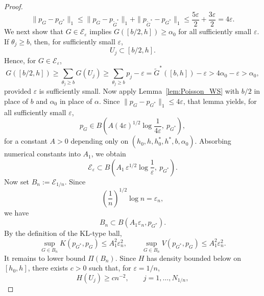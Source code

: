 \documentclass[twoside,12pt]{article}
\begin{document}
\begin{proof}
\begin{displaymath}
\|p_G-p_{G^\ast}\|_1\le\|p_G-p_{\tilde G^\ast}\|_1+\|p_{\tilde G^\ast}-p_{G^\ast}\|_1\le\frac{5\varepsilon}{2}+\frac{3\varepsilon}{2}=4\varepsilon.
\end{displaymath}
We next show that $G\in\mathcal E_\varepsilon$ implies $G([b/2,h])\ge\alpha_0$ for all sufficiently small $\varepsilon$. If $\theta_j\ge b$, then, for sufficiently small $\varepsilon$,
\begin{displaymath}
U_j\subset [b/2,h].
\end{displaymath}
Hence, for $G\in\mathcal E_\varepsilon$,
\begin{displaymath}
G([b/2,h])\ge\sum_{\theta_j\ge b}G(U_j)\ge\sum_{\theta_j\ge b}p_j-\varepsilon=\tilde G^\ast([b,h])-\varepsilon>4\alpha_0-\varepsilon>\alpha_0,
\end{displaymath}
provided $\varepsilon$ is sufficiently small. Now apply Lemma~\ref{lem:Poisson_WS} with $b/2$ in place of $b$ and $\alpha_0$ in place of $\alpha$. Since $\|p_G-p_{G^\ast}\|_1\le 4\varepsilon$, that lemma yields, for all sufficiently
small $\varepsilon$,
\begin{displaymath}
p_G\in B\!\left(A(4\varepsilon)^{1/2}\log\frac{1}{4\varepsilon},\ p_{G^\ast}\right),
\end{displaymath}
for a constant $A>0$ depending only on $(h_0,h,h_0^\ast,h^\ast,b,\alpha_0)$. Absorbing numerical constants into $A_1$, we obtain
\begin{displaymath}
\mathcal E_\varepsilon\subset B\!\left(A_1\,\varepsilon^{1/2}\log\frac{1}{\varepsilon},\ p_{G^\ast}\right).
\end{displaymath}
Now set $B_n:=\mathcal E_{1/n}$. Since
\begin{displaymath}
\left(\frac{1}{n}\right)^{1/2}\log n=\varepsilon_n,
\end{displaymath}
we have
\begin{displaymath}
B_n\subset B(A_1\varepsilon_n,p_{G^\ast}).
\end{displaymath}
By the definition of the KL-type ball,
\begin{displaymath}
\sup_{G\in B_n}K(p_{G^\ast},p_G)\le A_1^2\varepsilon_n^2,\qquad\sup_{G\in B_n}V(p_{G^\ast},p_G)\le A_1^2\varepsilon_n^2.
\end{displaymath}
It remains to lower bound $\Pi(B_n)$. Since $H$ has density bounded below on $[h_{0},h]$, there exists $c>0$ such that, for $\varepsilon=1/n$,
\begin{displaymath}
H(U_j)\ge c n^{-2},\qquad j=1,\dots,N_{1/n},
\end{displaymath}

\end{proof}
\end{document}
